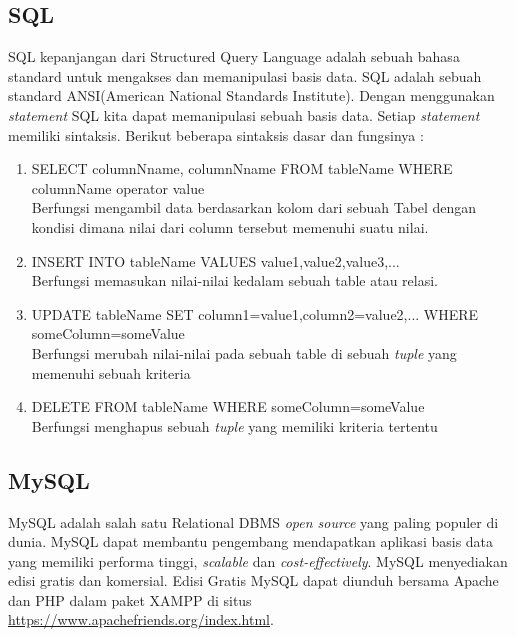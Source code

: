 \subsection{SQL}
SQL kepanjangan dari Structured Query Language adalah sebuah bahasa standard untuk mengakses dan memanipulasi basis data. SQL adalah sebuah standard ANSI(American National Standards Institute). Dengan menggunakan \textit{statement} SQL kita dapat memanipulasi sebuah basis data. Setiap \textit{statement} memiliki sintaksis. Berikut beberapa sintaksis dasar dan fungsinya :
\begin{enumerate}
	\item SELECT columnNname, columnNname FROM tableName WHERE columnName operator value \\ Berfungsi mengambil data berdasarkan kolom dari sebuah Tabel dengan kondisi dimana nilai dari column tersebut memenuhi suatu nilai.
	\item INSERT INTO tableName VALUES value1,value2,value3,...\\
Berfungsi memasukan nilai-nilai kedalam sebuah table atau relasi.
	\item UPDATE tableName SET column1=value1,column2=value2,... WHERE someColumn=someValue\\
Berfungsi merubah nilai-nilai pada sebuah table di sebuah \textit{tuple} yang memenuhi sebuah kriteria
	\item DELETE FROM tableName WHERE someColumn=someValue\\
	Berfungsi menghapus sebuah \textit{tuple} yang memiliki kriteria tertentu
\end{enumerate}
\subsection{MySQL}
MySQL adalah salah satu Relational DBMS \textit{open source} yang paling populer di dunia. MySQL dapat membantu pengembang mendapatkan aplikasi basis data yang memiliki performa tinggi, \textit{scalable} dan \textit{cost-effectively}. MySQL menyediakan edisi gratis dan komersial. Edisi Gratis MySQL dapat diunduh bersama Apache dan PHP dalam paket XAMPP di situs \url{https://www.apachefriends.org/index.html}.
